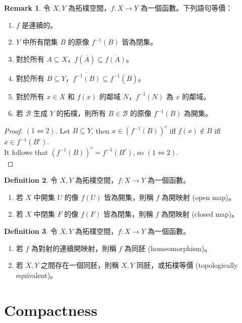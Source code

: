 \documentclass[12pt]{article}
\theoremstyle{definition}
\newtheorem{definition}{Definition}[section]
\newtheorem{remark}[definition]{Remark}
\newcommand\<{\langle}
\renewcommand\>{\rangle}
\begin{document}
\begin{CJK}{UTF8}{bsmi}
\begin{remark}
    令 $X, Y$ 為拓樸空間，$f:X\to Y$ 為一個函數。下列語句等價：
    \begin{enumerate}
        \item $f$ 是連續的。
        \item $Y$ 中所有閉集 $B$ 的原像 $f^{-1}(B)$ 皆為閉集。
        \item 對於所有 $A\subseteq X$，$f(\overline{A})\subseteq\overline{f(A)}$。
        \item 對於所有 $B\subseteq Y$，$\overline{f^{-1}(B)}\subseteq f^{-1}(\overline{B})$。
        \item 對於所有 $x\in X$ 和 $f(x)$ 的鄰域 $N$，$f^{-1}(N)$ 為 $x$ 的鄰域。
        \item 若 $\mathcal{B}$ 生成 $Y$ 的拓樸，則所有 $B\in\mathcal{B}$ 的原像 $f^{-1}(B)$ 為開集。
    \end{enumerate}
\end{remark}
\begin{proof}
    $(1\Leftrightarrow2)$. Let $B\subseteq Y$, then $x\in(f^{-1}(B))^c$ iff $f(x)\notin B$ iff $x\in f^{-1}(B^c)$. \\
    It follows that $(f^{-1}(B))^c=f^{-1}(B^c)$, so $(1\Leftrightarrow2)$. \\
\end{proof}

\begin{definition}
    令 $X, Y$ 為拓樸空間，$f:X\to Y$ 為一個函數。
    \begin{enumerate}
        \item 若 $X$ 中開集 $U$ 的像 $f(U)$ 皆為開集，則稱 $f$ 為開映射 (open map)。
        \item 若 $X$ 中閉集 $F$ 的像 $f(F)$ 皆為閉集，則稱 $f$ 為閉映射 (closed map)。
    \end{enumerate}
\end{definition}

\begin{definition}
    令 $X, Y$ 為拓樸空間，$f:X\to Y$ 為一個函數。
    \begin{enumerate}
        \item 若 $f$ 為對射的連續開映射，則稱 $f$ 為同胚 (homeomorphism)。
        \item 若 $X, Y$ 之間存在一個同胚，則稱 $X, Y$ 同胚，或拓樸等價 (topologically equivalent)。
    \end{enumerate}
\end{definition}

\section{Compactness}


\end{CJK}
\end{document}
